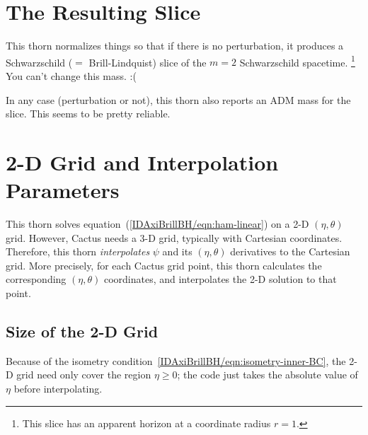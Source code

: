 \documentclass{article}
\begin{document}

\section{The Resulting Slice}

This thorn normalizes things so that if there is no perturbation,
it produces a Schwarzschild ($=$ Brill-Lindquist) slice of the $m=2$
Schwarzschild spacetime.%
\footnote{%
	 This slice has an apparent horizon at a
	 coordinate radius $r=1$.
	 }%
{}  You can't change this mass. :(

In any case (perturbation or not), this thorn also reports an ADM mass
for the slice.  This seems to be pretty reliable.


\section{2-D Grid and Interpolation Parameters}

This thorn solves equation~(\ref{IDAxiBrillBH/eqn:ham-linear}) on a 2-D
$(\eta,\theta)$ grid.  However, Cactus needs a 3-D grid, typically with
Cartesian coordinates.  Therefore, this thorn \emph{interpolates} $\psi$
and its $(\eta,\theta)$ derivatives to the Cartesian grid.  More precisely,
for each Cactus grid point, this thorn calculates the corresponding
$(\eta,\theta)$ coordinates, and interpolates the 2-D solution to
that point.


\subsection{Size of the 2-D Grid}

Because of the isometry condition~\eqref{IDAxiBrillBH/eqn:isometry-inner-BC},
the 2-D grid need only cover the region $\eta \ge 0$; the code just
takes the absolute value of $\eta$ before interpolating.
\end{document}
